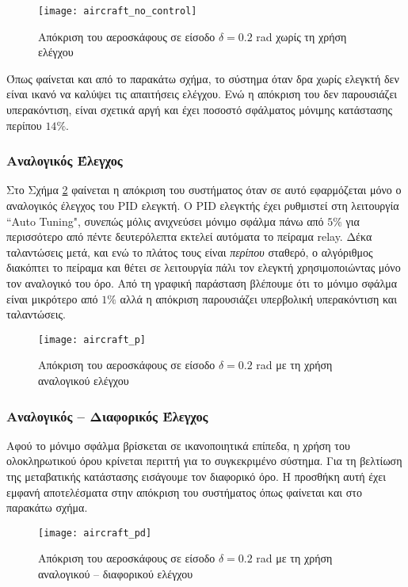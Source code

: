 \begin{figure}[h]
  \centering
  \texttt{[image: aircraft\_no\_control]}
  \caption{Απόκριση του αεροσκάφους σε είσοδο $\delta = 0.2$ rad χωρίς τη χρήση ελέγχου}
  \label{fig:aircraft_no_control}
\end{figure}

Όπως φαίνεται και από το παρακάτω σχήμα, το σύστημα όταν δρα χωρίς ελεγκτή δεν είναι ικανό να καλύψει τις απαιτήσεις ελέγχου. Ενώ η απόκριση του δεν παρουσιάζει υπερακόντιση, είναι σχετικά αργή και έχει ποσοστό σφάλματος μόνιμης κατάστασης περίπου $14\%$.

\subsubsection{Αναλογικός Έλεγχος}

Στο Σχήμα \ref{fig:aircraft_p} φαίνεται η απόκριση του συστήματος όταν σε αυτό εφαρμόζεται μόνο ο αναλογικός έλεγχος του PID ελεγκτή. Ο PID ελεγκτής έχει ρυθμιστεί στη λειτουργία ``Auto Tuning", συνεπώς μόλις ανιχνεύσει μόνιμο σφάλμα πάνω από $5\%$ για περισσότερο από πέντε δευτερόλεπτα εκτελεί αυτόματα το πείραμα relay. Δέκα ταλαντώσεις μετά, και ενώ το πλάτος τους είναι \emph{περίπου} σταθερό, ο αλγόριθμος διακόπτει το πείραμα και θέτει σε λειτουργία πάλι τον ελεγκτή χρησιμοποιώντας μόνο τον αναλογικό του όρο. Από τη γραφική παράσταση βλέπουμε ότι το μόνιμο σφάλμα είναι μικρότερο από $1\%$ αλλά η απόκριση παρουσιάζει υπερβολική υπερακόντιση και ταλαντώσεις.

\begin{figure}[h]
  \centering
  \texttt{[image: aircraft\_p]}
  \caption{Απόκριση του αεροσκάφους σε είσοδο $\delta = 0.2$ rad με τη χρήση αναλογικού ελέγχου}
  \label{fig:aircraft_p}
\end{figure}

\subsubsection{Αναλογικός -- Διαφορικός Έλεγχος}

Αφού το μόνιμο σφάλμα βρίσκεται σε ικανοποιητικά επίπεδα, η χρήση του ολοκληρωτικού όρου κρίνεται περιττή για το συγκεκριμένο σύστημα. Για τη βελτίωση της μεταβατικής κατάστασης εισάγουμε τον διαφορικό όρο. Η προσθήκη αυτή έχει εμφανή αποτελέσματα στην απόκριση του συστήματος όπως φαίνεται και στο παρακάτω σχήμα.

\begin{figure}[h]
  \centering
  \texttt{[image: aircraft\_pd]}
  \caption{Απόκριση του αεροσκάφους σε είσοδο $\delta = 0.2$ rad με τη χρήση αναλογικού -- διαφορικού ελέγχου}
  \label{fig:aircraft_pd}
\end{figure}

